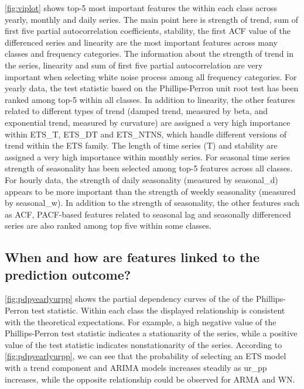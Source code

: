 \documentclass[11pt,a4paper,]{article}
\begin{document}
\autoref{fig:viplot} shows top-5 most important features the within each class across yearly, monthly and daily series. The main point here is strength of trend, sum of first five partial autocorrelation coefficients, stability, the first ACF value of the differenced series and linearity are the most important features across many classes and frequency categories. The information about the strength of trend in the series, linearity and sum of first five partial autocorrelation are very important when selecting white noise process among all frequency categories. For yearly data, the test statistic based on the Phillips-Perron unit root test has been ranked among top-5 within all classes. In addition to linearity, the other features related to different types of trend (damped trend, measured by beta, and exponential trend, measured by curvature) are assigned a very high importance within ETS\_T, ETS\_DT and ETS\_NTNS, which handle different versions of trend within the ETS family. The length of time series (T) and stability are assigned a very high importance within monthly series. For seasonal time series strength of seasonality has been selected among top-5 features across all classes. For hourly data, the strength of daily seasonality (measured by seasonal\_d) appears to be more important than the strength of weekly seasonality (measured by seasonal\_w). In addition to the strength of seasonality, the other features such as ACF, PACF-based features related to seasonal lag and seasonally differenced series are also ranked among top five within some classes.

\hypertarget{when-and-how-are-features-linked-to-the-prediction-outcome}{%
\subsection{When and how are features linked to the prediction outcome?}\label{when-and-how-are-features-linked-to-the-prediction-outcome}}

\autoref{fig:pdpyearlyurpp} shows the partial dependency curves of the of the Phillips-Perron test statistic.
Within each class the displayed relationship is consistent with the theoretical expectations. For example, a high negative value of the Phillips-Perron test statistic indicates a stationarity of the series, while a positive value of the test statistic indicates nonstationarity of the series. According to \autoref{fig:pdpyearlyurpp}, we can see that the probability of selecting an ETS model with a trend component and ARIMA models increases steadily as ur\_pp increases, while the opposite relationship could be observed for ARMA and WN.
\end{document}
